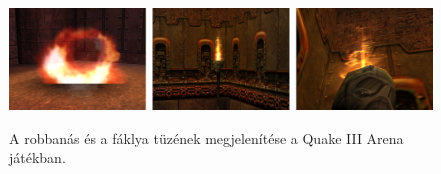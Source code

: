 \begin{figure}[h]
 \caption{A robbanás és a fáklya tüzének megjelenítése a Quake III Arena játékban.}
 \includegraphics[width=\textwidth]{kepek/quake3fire.png}
 \label{fig:quake3fire}
\end{figure}





